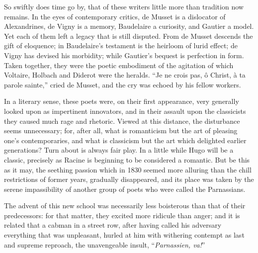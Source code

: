\documentclass[]{book}
\begin{document}
So swiftly does time go by, that of these writers little more than
tradition now remains. In the eyes of contemporary critics, de Musset is
a dislocator of Alexandrines, de Vigny is a memory, Baudelaire a
curiosity, and Gautier a model. Yet each of them left a legacy that is
still disputed. From de Musset descends the gift of eloquence; in
Baudelaire's testament is the heirloom of lurid effect; de Vigny has
devised his morbidity; while Gautier's bequest is perfection in form.
Taken together, they were the poetic embodiment of the agitation of
which Voltaire, Holbach and Diderot were the heralds. ``Je ne crois pas,
ô Christ, à ta parole sainte,'' cried de Musset, and the cry was echoed
by his fellow workers.

In a literary sense, these poets were, on their first appearance, very
generally looked upon as impertinent innovators, and in their assault
upon the classicists they caused much rage and rhetoric. Viewed at this
distance, the disturbance seems unnecessary; for, after all, what is
romanticism but the art of pleasing one's contemporaries, and what is
classicism but the art which delighted earlier generations? Turn about
is always fair play. In a little while Hugo will be a classic, precisely
as Racine is beginning to be considered a romantic. But be this as it
may, the seething passion which in 1830 seemed more alluring than the
chill restrictions of former years, gradually disappeared, and its place
was taken by the serene impassibility of another group of poets who were
called the Parnassians.

The advent of this new school was necessarily less boisterous than that
of their predecessors: for that matter, they excited more ridicule than
anger; and it is related that a cabman in a street row, after having
called his adversary everything that was unpleasant, hurled at him with
withering contempt as last and supreme reproach, the unavengeable
insult, ``\emph{Parnassien, va!}''
\end{document}
